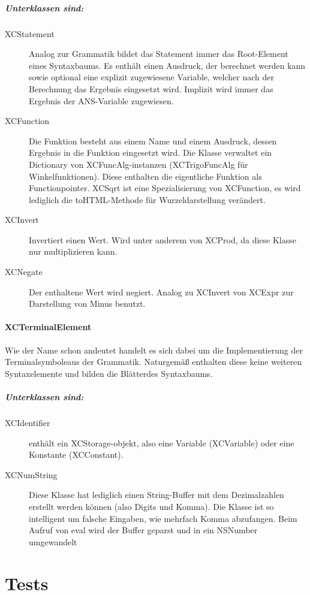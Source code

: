 \paragraph{Unterklassen sind:} 
\begin{description}
	\item[XCStatement]
		Analog zur Grammatik bildet das Statement immer das Root-Element eines Syntaxbaums. Es enthält einen Ausdruck, der berechnet werden kann sowie optional eine explizit zugewiesene Variable, welcher nach der Berechnung das Ergebnis eingesetzt wird. Implizit wird immer das Ergebnis der ANS-Variable zugewiesen. 
	\item[XCFunction] Die Funktion besteht aus einem Name und einem Ausdruck, dessen Ergebnis in die Funktion eingesetzt wird. Die Klasse verwaltet ein Dictionary von XCFuncAlg-instanzen (XCTrigoFuncAlg für Winkelfunktionen). Diese enthalten die eigentliche Funktion als Functionpointer.
		XCSqrt ist eine Spezialisierung von XCFunction, es wird lediglich die toHTML-Methode für Wurzeldarstellung verändert.
	\item[XCInvert]
		Invertiert einen Wert. Wird unter anderem von XCProd, da diese Klasse nur multiplizieren kann.
	\item[XCNegate] Der enthaltene Wert wird negiert. Analog zu XCInvert von XCExpr zur 
		Darstellung von Minus benutzt.
\end{description}
\subsubsection{XCTerminalElement}
Wie der Name schon andeutet handelt es sich dabei um die Implementierung der Terminalsymboleaus der Grammatik. Naturgemäß enthalten diese keine weiteren Syntaxelemente und bilden die Blätterdes Syntaxbaums.

\paragraph{Unterklassen sind:} 
\begin{description}
	\item[XCIdentifier] enthält ein XCStorage-objekt, also eine Variable (XCVariable) oder eine Konstante (XCConstant).
	\item[XCNumString] Diese Klasse hat lediglich einen String-Buffer mit dem Dezimalzahlen erstellt werden können (also Digits und Komma). Die Klasse ist so intelligent um falsche Eingaben, wie mehrfach Komma abzufangen.
		Beim Aufruf von eval wird der Buffer geparst und in ein NSNumber umgewandelt
\end{description}

\chapter{Tests}
